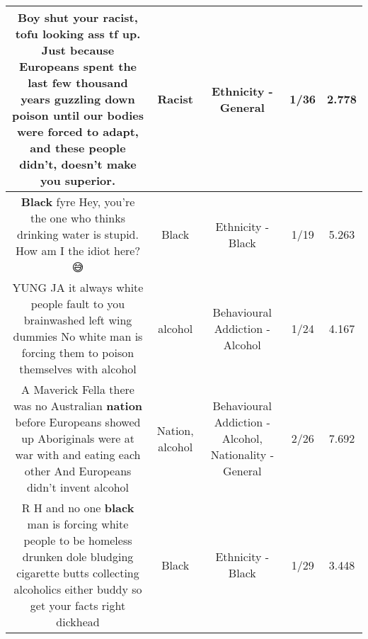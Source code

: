 \documentclass[11pt]{article}
\newlength\mylength
\begin{document}
\begin{center}
\begin{longtable}{|C{.65\mylength}|C{.30\mylength}|C{.12\mylength}|C{.12\mylength}|C{.12\mylength}|}
  \small Boy shut your \textbf{racist}, tofu looking ass tf up. Just because Europeans spent the last few thousand years guzzling down poison until our bodies were forced to adapt, and these people didn't, doesn't make you superior.\normalsize   & Racist & Ethnicity - General & 1/36 & 2.778 \\  \hline
  \small \@\textbf{Black} fyre Hey, you're the one who thinks drinking water is stupid. How am I the idiot here? 😅\normalsize   & Black & Ethnicity - Black & 1/19 & 5.263 \\  \hline
  \small YUNG JA it always white people fault to you brainwashed left wing dummies No white man is forcing them to poison themselves with alcohol\normalsize   & alcohol & Behavioural Addiction - Alcohol & 1/24 & 4.167 \\  \hline
  \small A Maverick Fella there was no Australian \textbf{nation} before Europeans showed up Aboriginals were at war with and eating each other And Europeans didn't invent alcohol\normalsize   & Nation, alcohol & Behavioural Addiction - Alcohol, Nationality - General & 2/26 & 7.692 \\  \hline
  \small R H and no one \textbf{black} man is forcing white people to be homeless drunken dole bludging cigarette butts collecting alcoholics either buddy so get your facts right dickhead\normalsize   & Black & Ethnicity - Black & 1/29 & 3.448 \\  \hline

\end{longtable}
\end{center}
\end{document}
